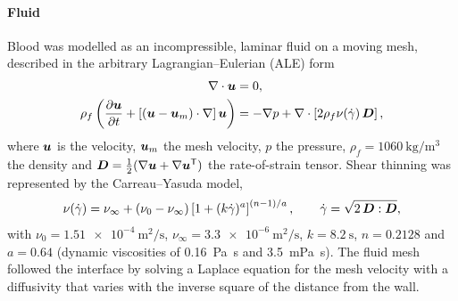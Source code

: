\paragraph{Fluid}
Blood was modelled as an incompressible, laminar fluid on a moving mesh, described in the arbitrary Lagrangian--Eulerian (ALE) form
\begin{align}
  \nabla \cdot \boldsymbol{u} &= 0, \label{eq:fluid-mass}\\
  \rho_f \left( \frac{\partial \boldsymbol{u}}{\partial t} + \left[(\boldsymbol{u} - \boldsymbol{u}_m)\cdot\nabla\right]\boldsymbol{u} \right)
    &= -\nabla p + \nabla \cdot \left[ 2 \rho_f \nu(\dot\gamma)\, \boldsymbol{D} \right], \label{eq:fluid-momentum}
\end{align}
where $\boldsymbol{u}$ is the velocity, $\boldsymbol{u}_m$ the mesh velocity, $p$ the pressure, $\rho_f = \SI{1060}{\kilo\gram\per\cubic\metre}$ the density and $\boldsymbol{D} = \tfrac12(\nabla\boldsymbol{u} + \nabla\boldsymbol{u}^{\mathsf{T}})$ the rate-of-strain tensor.
Shear thinning was represented by the Carreau--Yasuda model,
\begin{equation}
  \nu(\dot\gamma) = \nu_\infty + (\nu_0 - \nu_\infty)\left[1 + (k\dot\gamma)^{a}\right]^{(n-1)/a},
  \qquad \dot\gamma = \sqrt{2\,\boldsymbol{D}:\boldsymbol{D}},
  \label{eq:carreau}
\end{equation}
with $\nu_0 = \SI{1.51e-4}{\square\metre\per\second}$, $\nu_\infty = \SI{3.3e-6}{\square\metre\per\second}$, $k = \SI{8.2}{\second}$, $n = 0.2128$ and $a = 0.64$ (dynamic viscosities of \SI{0.16}{\pascal\second} and \SI{3.5}{\milli\pascal\second}).
The fluid mesh followed the interface by solving a Laplace equation for the mesh velocity with a diffusivity that varies with the inverse square of the distance from the wall.

